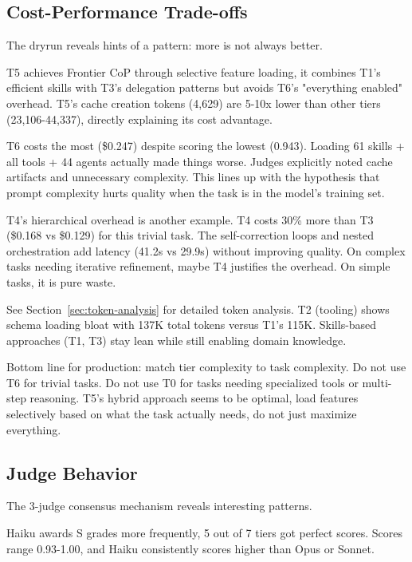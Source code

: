 \documentclass[11pt]{article}
\begin{document}
\subsection{Cost-Performance Trade-offs}\label{sec:cost-tradeoffs}

The dryrun reveals hints of a pattern: more is not always better.

T5 achieves Frontier CoP through selective feature loading, it combines T1's
efficient skills with T3's delegation patterns but avoids T6's "everything
enabled" overhead. T5's cache creation tokens (4,629) are 5-10x lower than other
tiers (23,106-44,337), directly explaining its cost advantage.

T6 costs the most (\$0.247) despite scoring the lowest
(0.943). Loading 61 skills + all tools + 44 agents actually made things worse.
Judges explicitly noted cache artifacts and unnecessary complexity. This lines
up with the hypothesis that prompt complexity hurts quality when the task is in
the model's training set.

T4's hierarchical overhead is another example. T4 costs 30\% more than T3
(\$0.168 vs \$0.129) for this trivial task. The self-correction loops and nested
orchestration add latency (41.2s vs 29.9s) without improving quality. On complex
tasks needing iterative refinement, maybe T4 justifies the overhead. On simple
tasks, it is pure waste.

See Section~\ref{sec:token-analysis} for detailed token analysis. T2 (tooling) shows schema loading bloat with 137K total tokens versus T1's 115K. Skills-based approaches (T1, T3) stay lean while still
enabling domain knowledge.

Bottom line for production: match tier complexity to task complexity. Do not use
T6 for trivial tasks. Do not use T0 for tasks needing specialized tools or
multi-step reasoning. T5's hybrid approach seems to be optimal, load features
selectively based on what the task actually needs, do not just maximize
everything.

\subsection{Judge Behavior}\label{sec:judge-behavior}

The 3-judge consensus mechanism reveals interesting patterns.

Haiku awards S grades more frequently, 5 out of 7 tiers got perfect scores. Scores
range 0.93-1.00, and Haiku consistently scores higher than Opus or Sonnet.
\end{document}

